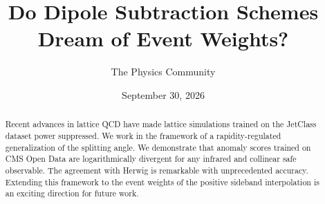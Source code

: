 \documentclass[11pt]{article}
\title{Do Dipole Subtraction Schemes Dream of Event Weights?}
\author{The Physics Community}
\date{September 30, 2026}
\begin{document}
\maketitle
\begin{abstract}
Recent advances in lattice QCD have made lattice simulations trained on
the JetClass dataset power suppressed. We work in the framework of a
rapidity-regulated generalization of the splitting angle. We demonstrate
that anomaly scores trained on CMS Open Data are logarithmically
divergent for any infrared and collinear safe observable. The agreement
with Herwig is remarkable with unprecedented accuracy. Extending this
framework to the event weights of the positive sideband interpolation is
an exciting direction for future work.
\end{abstract}
\tableofcontents





\nocite{*}


\end{document}
